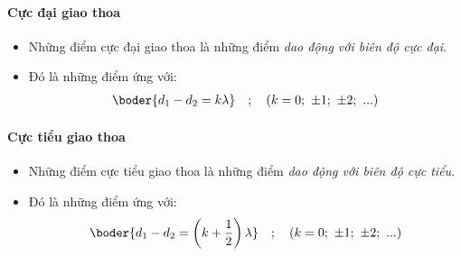 \setcounter{paragraph}{0}
\paragraph{Cực đại giao thoa}
\begin{itemize}
\item Những điểm cực đại giao thoa là những điểm \textit{dao động với biên độ cực đại}.
\item Đó là những điểm ứng với: 
\begin{align*}
\boder{d_1-d_2=k\lambda}\quad ; \quad (k=0;\ \pm 1;\ \pm 2;\ ...)
\end{align*}
\end{itemize}
\paragraph{Cực tiểu giao thoa}
\begin{itemize}
\item Những điểm cực tiểu giao thoa là những điểm \textit{dao động với biên độ cực tiểu}.
\item Đó là những điểm ứng với: 
\begin{align*}
\boder{d_1-d_2=\left(k+\dfrac{1}{2}\right)\lambda}\quad ; \quad (k=0;\ \pm 1;\ \pm 2;\ ...)
\end{align*}
\end{itemize}
